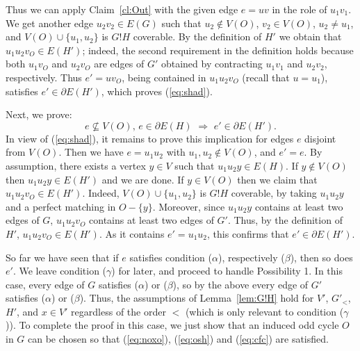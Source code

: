 \documentclass{article}
\theoremstyle{definition}
\begin{document}
Thus we can apply Claim~\ref{cl:Out} with the given edge $e = uv$ in the role of $u_1v_1$. We get another edge $u_2v_2 \in E(G)$ such that $u_2 \notin V(O)$, $v_2 \in V(O)$, $u_2 \ne u_1$, and $V(O) \cup \{u_1, u_2\}$ is $G!H$ coverable. By the definition of $H'$ we obtain that $u_1u_2v_O \in E(H')$; indeed, the second requirement in the definition holds because both $u_1v_O$ and $u_2v_O$ are edges of $G'$ obtained by contracting $u_1v_1$ and $u_2v_2$, respectively. Thus $e' = uv_O$, being contained in $u_1u_2v_O$ (recall that $u = u_1$), satisfies $e' \in \partial E(H')$, which proves (\ref{eq:shad}).

Next, we prove:
\begin{equation} \label{eq:con2}
e \nsubseteq V(O),\, e \in \partial E(H)\,\,\Longrightarrow\,\, e' \in \partial E(H').
\end{equation}
In view of (\ref{eq:shad}), it remains to prove this implication for edges $e$ disjoint from $V(O)$. Then we have $e = u_1u_2$ with $u_1, u_2 \notin V(O)$, and $e' = e$. By assumption, there exists a vertex $y \in V$ such that $u_1u_2y \in E(H)$. If $y \notin V(O)$ then $u_1u_2y \in E(H')$ and we are done. If $y \in V(O)$ then we claim that $u_1u_2v_O \in E(H')$. Indeed, $V(O) \cup \{u_1, u_2\}$ is $G!H$ coverable, by taking $u_1u_2y$ and a perfect matching in $O - \{y\}$. Moreover, since $u_1u_2y$ contains at least two edges of $G$, $u_1u_2v_O$ contains at least two edges of $G'$. Thus, by the definition of $H'$, $u_1u_2v_O \in E(H')$. As it contains $e' = u_1u_2$, this confirms that $e' \in \partial E(H')$.

So far we have seen that if $e$ satisfies condition ($\alpha$), respectively ($\beta$), then so does $e'$. We leave condition ($\gamma$) for later, and proceed to handle Possibility 1. In this case, every edge of $G$ satisfies ($\alpha$) or ($\beta$), so by the above every edge of $G'$ satisfies ($\alpha$) or ($\beta$). Thus, the assumptions of Lemma~\ref{lem:G!H} hold for $V'$, $G'_<$, $H'$, and $x \in V'$ regardless of the order $<$ (which is only relevant to condition ($\gamma$)). To complete the proof in this case, we just show that an induced odd cycle $O$ in $G$ can be chosen so that (\ref{eq:noxo}), (\ref{eq:osh}) and (\ref{eq:cfc}) are satisfied.
\end{document}
